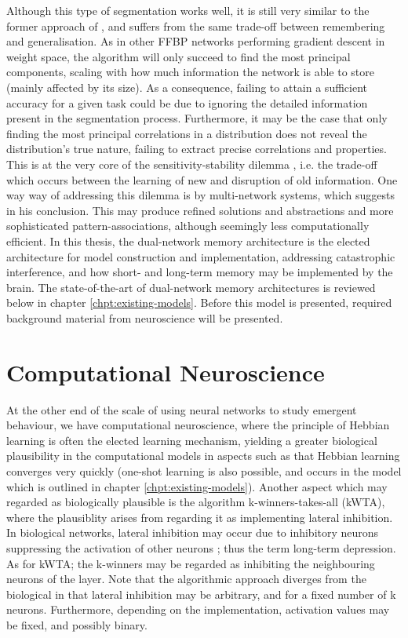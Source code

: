 Although this type of segmentation works well, it is still very similar to the former approach of \cite{French1992}, and suffers from the same trade-off between remembering and generalisation. As in other FFBP networks performing gradient descent in weight space, the algorithm will only succeed to find the most principal components, scaling with how much information the network is able to store (mainly affected by its size). As a consequence, failing to attain a sufficient accuracy for a given task could be due to ignoring the detailed information present in the segmentation process. Furthermore, it may be the case that only finding the most principal correlations in a distribution does not reveal the distribution's true nature, failing to extract precise correlations and properties. This is at the very core of the sensitivity-stability dilemma \citep{Hebb1949}, i.e. the trade-off which occurs between the learning of new and disruption of old information. One way way of addressing this dilemma is by multi-network systems, which \cite{French1994} suggests in his conclusion. This may produce refined solutions and abstractions and more sophisticated pattern-associations, although seemingly less computationally efficient. In this thesis, the dual-network memory architecture \citep{McClelland1995} is the elected architecture for model construction and implementation, addressing catastrophic interference, and how short- and long-term memory may be implemented by the brain. The state-of-the-art of dual-network memory architectures is reviewed below in chapter \ref{chpt:existing-models}. Before this model is presented, required background material from neuroscience will be presented.


\section{Computational Neuroscience}

At the other end of the scale of using neural networks to study emergent behaviour, we have computational neuroscience,  where the principle of Hebbian learning is often the elected learning mechanism, yielding a greater biological plausibility in the computational models in aspects such as that Hebbian learning converges very quickly (one-shot learning is also possible, and occurs in the model which is outlined in chapter \ref{chpt:existing-models}). Another aspect which may regarded as biologically plausible is the algorithm k-winners-takes-all (kWTA), where the plausiblity arises from regarding it as implementing lateral inhibition. In biological networks, lateral inhibition may occur due to inhibitory neurons suppressing the activation of other neurons \citep{Rolls1998chpt1}; thus the term long-term depression. As for kWTA; the k-winners may be regarded as inhibiting the neighbouring neurons of the layer. Note that the algorithmic approach diverges from the biological in that lateral inhibition may be arbitrary, and for a fixed number of k neurons. Furthermore, depending on the implementation, activation values may be fixed, and possibly binary.

